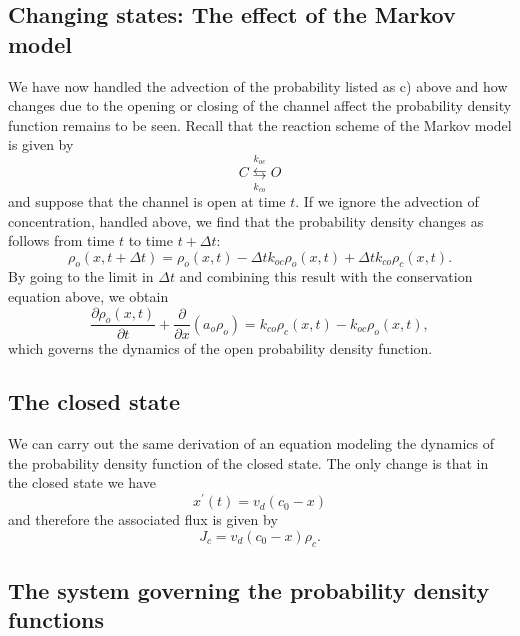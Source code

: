 \bigskip

\subsection{Changing states: The effect of the Markov model}

We have now handled the advection of the probability listed as c) above and 
how changes due to the opening or closing of the channel affect
the probability density function remains to be seen. Recall that the reaction scheme of the
Markov model is given by%
\begin{equation}
C\underset{k_{co}}{\overset{k_{oc}}{\leftrightarrows}}O
\end{equation}
and suppose that the channel is open at time $t$. If we ignore the advection
of concentration, handled above, we find that the probability density changes
as follows from time $t$ to time $t+\Delta t:$%
\[
\rho_{o}(x,t+\Delta t)=\rho_{o}(x,t)-\Delta tk_{oc}\rho_{o}(x,t)+\Delta
tk_{co}\rho_{c}(x,t).
\]
By going to the limit in $\Delta t$ and combining this result with the
conservation equation above, we obtain%
\[
\frac{\partial\rho_{o}\left(  x,t\right)  }{\partial t}+\frac{\partial
}{\partial x}(a_o  \rho_{o})=k_{co}%
\rho_{c}(x,t)-k_{oc}\rho_{o}(x,t),
\]
which governs the dynamics of the open probability density function.

\subsection{The closed state}

We can carry out the same derivation of an equation modeling the dynamics of the
probability density function of the closed state. The only change is that in the
closed state we have
\[
x^{\prime}(t)=v_{d}(c_{0}-x)
\]
and therefore the associated flux is given by%
\begin{equation}
J_{c}=v_{d}(c_{0}-x)\rho_{c}.
\end{equation}


\subsection{The system governing the probability density
functions \label{system_def_99}}

